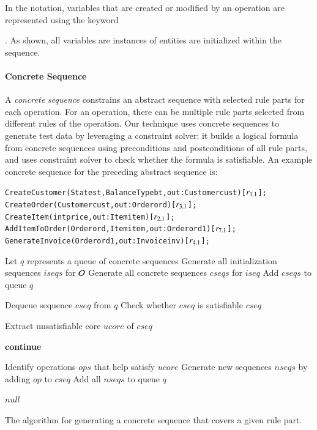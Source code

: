 In the notation, variables that are created or modified by an operation are
represented using the keyword \subject{out}. As shown, all variables are
instances of entities are initialized within the sequence.

\vskip -7pt
\paragraph*{Concrete Sequence} A \textit{concrete sequence} constrains an
abstract sequence with selected rule parts for each operation. For an operation,
there can be multiple rule parts selected from different rules of the
operation. Our technique uses concrete sequences to generate test data by
leveraging a constraint solver: it builds a logical formula from concrete
sequences using preconditions and postconditions of all rule parts, and uses
constraint solver to check whether the formula is satisfiable. An example
concrete sequence for the preceding abstract sequence is:

\vspace*{-4pt}
{\scriptsize
\begin{alltt}
 CreateCustomer(State st, BalanceType bt, out: Customer cust) [\(r\sb{1.1}\)];
 CreateOrder(Customer cust, out: Order ord) [\(r\sb{3.1}\)];	
 CreateItem(int price, out: Item item) [\(r\sb{2.1}\)];
 AddItemToOrder(Order ord, Item item, out: Order ord1) [\(r\sb{7.1}\)];
 GenerateInvoice(Order ord1, out: Invoice inv) [\(r\sb{4.1}\)];  
\end{alltt}
}
\vspace*{-5pt}

\begin{algorithm}[t]
\small
\SetAlgoVlined
{}
\BlankLine

\nl Let $q$ represents a queue of concrete sequences\;
\nl Generate all initialization sequences $iseqs$ for ${\cal O}$\;
\nl {}
{
		\nl Generate all concrete sequences $cseqs$ for $iseq$\;
		\nl Add $cseqs$ to queue $q$\;
} 

\nl {}
{
		\nl Dequeue sequence $cseq$ from $q$\;
		\nl Check whether $cseq$ is satisfiable\;
		\nl {}
		{
				\Return $cseq$\;
		}
		
		\nl Extract unsatisfiable core $ucore$ of $cseq$\;
		
		\nl {}
		{
				{\bf continue}\;
		}
		
		\nl Identify operations $ops$ that help satisfy $ucore$\;		
		\nl {}
		{
			\nl Generate new sequences $nseqs$ by adding $op$ to $cseq$\;
			\nl Add all $nseqs$ to queue $q$\;
		}
}

\Return $null$\;
		
\caption{\label{alg:guidedsearch} The algorithm for
  generating a concrete sequence that covers a given rule part.}
\end{algorithm}

